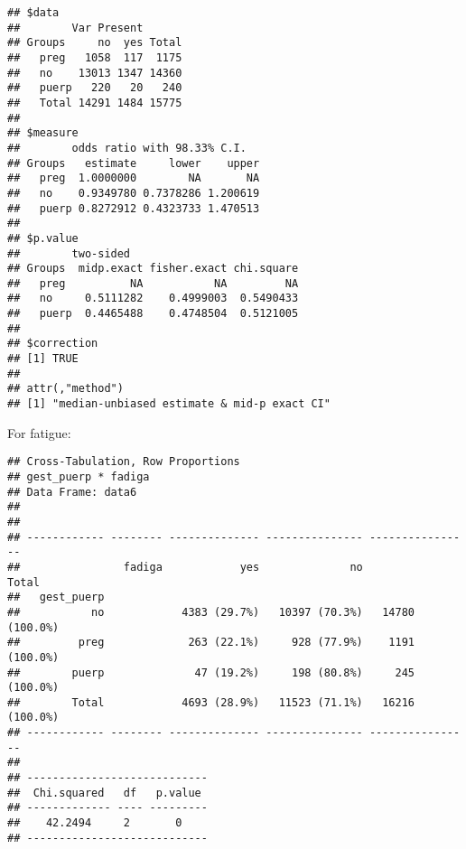 \documentclass[
]{article}
\newenvironment{Shaded}{\begin{snugshade}}{\end{snugshade}}
\newcommand{\DataTypeTok}[1]{\textcolor[rgb]{0.13,0.29,0.53}{#1}}
\newcommand{\KeywordTok}[1]{\textcolor[rgb]{0.13,0.29,0.53}{\textbf{#1}}}
\newcommand{\NormalTok}[1]{#1}
\newcommand{\OperatorTok}[1]{\textcolor[rgb]{0.81,0.36,0.00}{\textbf{#1}}}
\newcommand{\OtherTok}[1]{\textcolor[rgb]{0.56,0.35,0.01}{#1}}
\newcommand{\StringTok}[1]{\textcolor[rgb]{0.31,0.60,0.02}{#1}}
\begin{document}
\begin{verbatim}
## $data
##        Var Present
## Groups     no  yes Total
##   preg   1058  117  1175
##   no    13013 1347 14360
##   puerp   220   20   240
##   Total 14291 1484 15775
## 
## $measure
##        odds ratio with 98.33% C.I.
## Groups   estimate     lower    upper
##   preg  1.0000000        NA       NA
##   no    0.9349780 0.7378286 1.200619
##   puerp 0.8272912 0.4323733 1.470513
## 
## $p.value
##        two-sided
## Groups  midp.exact fisher.exact chi.square
##   preg          NA           NA         NA
##   no     0.5111282    0.4999003  0.5490433
##   puerp  0.4465488    0.4748504  0.5121005
## 
## $correction
## [1] TRUE
## 
## attr(,"method")
## [1] "median-unbiased estimate & mid-p exact CI"
\end{verbatim}

For fatigue:

\begin{Shaded}
\end{Shaded}

\begin{verbatim}
## Cross-Tabulation, Row Proportions  
## gest_puerp * fadiga  
## Data Frame: data6  
## 
## 
## ------------ -------- -------------- --------------- ----------------
##                fadiga            yes              no            Total
##   gest_puerp                                                         
##           no            4383 (29.7%)   10397 (70.3%)   14780 (100.0%)
##         preg             263 (22.1%)     928 (77.9%)    1191 (100.0%)
##        puerp              47 (19.2%)     198 (80.8%)     245 (100.0%)
##        Total            4693 (28.9%)   11523 (71.1%)   16216 (100.0%)
## ------------ -------- -------------- --------------- ----------------
## 
## ----------------------------
##  Chi.squared   df   p.value 
## ------------- ---- ---------
##    42.2494     2       0    
## ----------------------------
\end{verbatim}

\begin{Shaded}
\end{Shaded}
\end{document}
